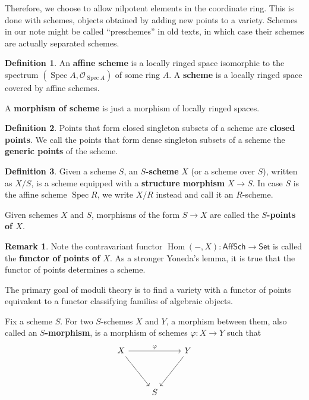 \documentclass[12pt]{article}
\theoremstyle{remark}
\theoremstyle{definition}
\newtheorem{remark}{Remark}[section]
\newtheorem{definition}{Definition}[section]
\newcommand{\Spec}[0]{\operatorname{Spec}}
\newcommand{\Hom}[0]{\operatorname{Hom}}
\newcommand{\Aff}[0]{\mathsf{Aff}}
\newcommand{\Sch}[0]{\mathsf{Sch}}
\newcommand{\Set}[0]{\mathsf{Set}}
\begin{document}
    Therefore, we choose to allow nilpotent elements in the coordinate ring. This is done with schemes, objects obtained by adding new points to a variety. Schemes in our note might be called ``preschemes'' in old texts, in which case their schemes are actually separated schemes.
    \begin{definition}
        An \textbf{affine scheme} is a locally ringed space isomorphic to the spectrum $(\Spec A, \mathcal O_{\Spec A})$ of some ring $A$. A \textbf{scheme} is a locally ringed space covered by affine schemes.

        A \textbf{morphism of scheme} is just a morphism of locally ringed spaces.
    \end{definition}
    \begin{definition}
        Points that form closed singleton subsets of a scheme are \textbf{closed points}. We call the points that form dense singleton subsets of a scheme the \textbf{generic points} of the scheme.
    \end{definition}
    \begin{definition}
        Given a scheme $S$, an \textbf{$S$-scheme} $X$ (or a scheme over $S$), written as $X/S$, is a scheme equipped with a \textbf{structure morphism} $X\to S$. In case $S$ is the affine scheme $\Spec R$, we write $X/R$ instead and call it an $R$-scheme.

        Given schemes $X$ and $S$, morphisms of the form $S\to X$ are called the \textbf{$S$-points of $X$}.
    \end{definition}
    \begin{remark}
        Note the contravariant functor $\Hom(-,X):\Aff\Sch\to \Set$ is called the \textbf{functor of points of $X$}. As a stronger Yoneda's lemma, it is true that the functor of points determines a scheme.

        The primary goal of moduli theory is to find a variety with a functor of points equivalent to a functor classifying families of algebraic objects.
    \end{remark}
    Fix a scheme $S$. For two $S$-schemes $X$ and $Y$, a morphism between them, also called an \textbf{$S$-morphism}, is a morphism of schemes $\varphi:X\to Y$ such that
    \[\begin{tikzcd}
        X \arrow[rdd] \arrow[rr, "\varphi"] &   & Y \arrow[ldd] \\
                                            &   &               \\
                                            & S &              
        \end{tikzcd}\]
\end{document}
